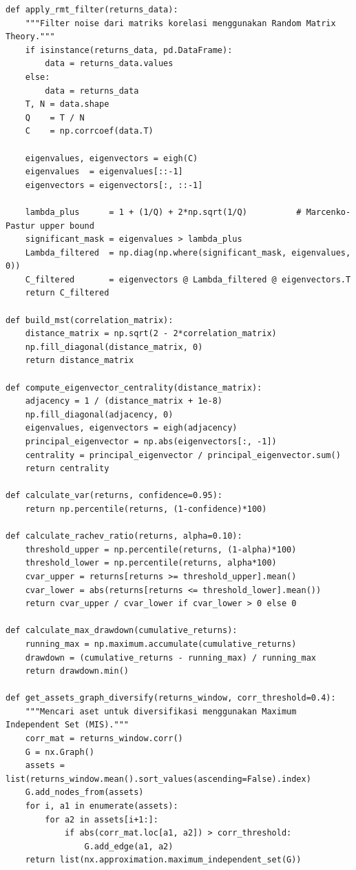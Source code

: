 \documentclass[12pt,a4paper]{article}
\begin{document}
\begin{lstlisting}[caption={Algoritma Network dan Metrik Risiko}]
def apply_rmt_filter(returns_data):
    """Filter noise dari matriks korelasi menggunakan Random Matrix Theory."""
    if isinstance(returns_data, pd.DataFrame):
        data = returns_data.values
    else:
        data = returns_data
    T, N = data.shape
    Q    = T / N
    C    = np.corrcoef(data.T)

    eigenvalues, eigenvectors = eigh(C)
    eigenvalues  = eigenvalues[::-1]
    eigenvectors = eigenvectors[:, ::-1]

    lambda_plus      = 1 + (1/Q) + 2*np.sqrt(1/Q)          # Marcenko-Pastur upper bound
    significant_mask = eigenvalues > lambda_plus
    Lambda_filtered  = np.diag(np.where(significant_mask, eigenvalues, 0))
    C_filtered       = eigenvectors @ Lambda_filtered @ eigenvectors.T
    return C_filtered

def build_mst(correlation_matrix):
    distance_matrix = np.sqrt(2 - 2*correlation_matrix)
    np.fill_diagonal(distance_matrix, 0)
    return distance_matrix

def compute_eigenvector_centrality(distance_matrix):
    adjacency = 1 / (distance_matrix + 1e-8)
    np.fill_diagonal(adjacency, 0)
    eigenvalues, eigenvectors = eigh(adjacency)
    principal_eigenvector = np.abs(eigenvectors[:, -1])
    centrality = principal_eigenvector / principal_eigenvector.sum()
    return centrality

def calculate_var(returns, confidence=0.95):
    return np.percentile(returns, (1-confidence)*100)

def calculate_rachev_ratio(returns, alpha=0.10):
    threshold_upper = np.percentile(returns, (1-alpha)*100)
    threshold_lower = np.percentile(returns, alpha*100)
    cvar_upper = returns[returns >= threshold_upper].mean()
    cvar_lower = abs(returns[returns <= threshold_lower].mean())
    return cvar_upper / cvar_lower if cvar_lower > 0 else 0

def calculate_max_drawdown(cumulative_returns):
    running_max = np.maximum.accumulate(cumulative_returns)
    drawdown = (cumulative_returns - running_max) / running_max
    return drawdown.min()

def get_assets_graph_diversify(returns_window, corr_threshold=0.4):
    """Mencari aset untuk diversifikasi menggunakan Maximum Independent Set (MIS)."""
    corr_mat = returns_window.corr()
    G = nx.Graph()
    assets = list(returns_window.mean().sort_values(ascending=False).index)
    G.add_nodes_from(assets)
    for i, a1 in enumerate(assets):
        for a2 in assets[i+1:]:
            if abs(corr_mat.loc[a1, a2]) > corr_threshold:
                G.add_edge(a1, a2)
    return list(nx.approximation.maximum_independent_set(G))


\end{lstlisting}
\end{document}

